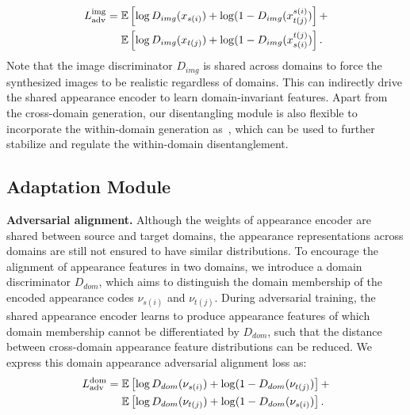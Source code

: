 \documentclass[runningheads]{llncs}
\begin{document}
\begin{equation}
\begin{aligned}
L^{\mathrm{img}}_{\mathrm{adv}} = \hspace{1mm} 
& \mathbb{E}\left[\log D_{img}(x_{s(i)}) + \log(1 - D_{img}(x^{s(i)}_{t(j)})\right] +\\
& \mathbb{E}\left[\log D_{img}(x_{t(j)}) + \log(1 - D_{img}(x^{t(j)}_{s(i)})\right].
\end{aligned}
\end{equation}
\noindent Note that the image discriminator $D_{img}$ is shared across domains to force the synthesized images to be realistic regardless of domains. This can indirectly drive the shared appearance encoder to learn domain-invariant features. Apart from the cross-domain generation, our disentangling module is also flexible to incorporate the within-domain generation as~\cite{zheng2019joint}, which can be used to further stabilize and regulate the within-domain disentanglement. 



\subsection{Adaptation Module}

\textbf{Adversarial alignment.} Although the weights of appearance encoder are shared between source and target domains, the appearance representations across domains are still not ensured to have similar distributions. To encourage the alignment of appearance features in two domains, we introduce a domain discriminator $D_{dom}$, which aims to distinguish the domain membership of the encoded appearance codes $\nu_{s(i)}$ and $\nu_{t(j)}$. During adversarial training, the shared appearance encoder learns to produce appearance features of which domain membership cannot be differentiated by $D_{dom}$, such that the distance between cross-domain appearance feature distributions can be reduced. We express this domain appearance adversarial alignment loss as:
\begin{equation}
\begin{aligned}
L^{\mathrm{dom}}_{\mathrm{adv}} = \hspace{1mm} 
& \mathbb{E}\left[\log D_{dom}(\nu_{s(i)}) + \log(1 - D_{dom}(\nu_{t(j)})\right] + \\
& \mathbb{E}\left[\log D_{dom}(\nu_{t(j)}) + \log(1 - D_{dom}(\nu_{s(i)})\right].
\end{aligned}
\end{equation}
\end{document}
